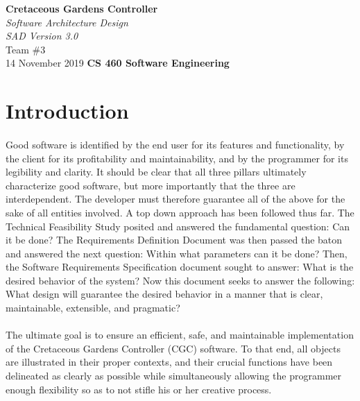 \documentclass[12pt]{article}
\begin{document}
\begin{titlepage}
    \begin{flushleft}
        \vspace{1cm} \Huge  \textbf{Cretaceous Gardens Controller}\\
        \vspace{1cm} \Huge  \textit{Software Architecture Design}\\
        \vspace{1cm} \Large \textit{SAD Version 3.0}\\
        \vspace{5cm} \LARGE         Team \#3\\ 
                                    14 November 2019
        \vfill       \Huge  \textbf{CS 460 Software Engineering}
    \end{flushleft}
\end{titlepage}
\normalsize 
\tableofcontents
\pagebreak

\section{Introduction} \label{intro}
\paragraph{} Good software is identified by the end user for its features and functionality, by the client
for its profitability and maintainability, and by the programmer for its legibility and clarity. It should be clear
that all three pillars ultimately characterize good software, but more importantly that the three are interdependent.
The developer must therefore guarantee all of the above for the sake of all entities involved. A top down approach has been
followed thus far. The Technical Feasibility Study posited and answered the fundamental question: Can it be done? The Requirements
Definition Document was then passed the baton and answered the next question: Within what parameters can it be done? Then, 
the Software Requirements Specification document sought to answer: What is the desired behavior of the system? Now this document 
seeks to answer the following: What design will guarantee the desired behavior in a manner that is clear, maintainable, extensible, 
and pragmatic?

\paragraph{} The ultimate goal is to ensure an efficient, safe, and maintainable implementation of the Cretaceous Gardens Controller 
(CGC) software. To that end, all objects are illustrated in their proper contexts, and their crucial 
functions have been delineated as clearly as possible while simultaneously allowing the programmer enough flexibility so 
as to not stifle his or her creative process. 
\end{document}
